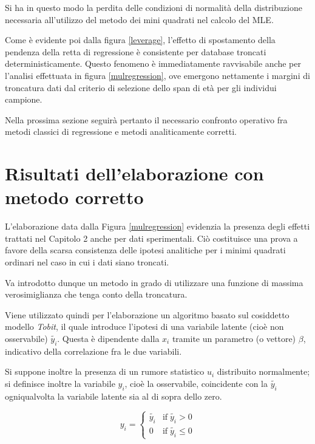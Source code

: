 \documentclass[12pt,openright,twoside,a4paper]{book}
\begin{document}
Si ha in questo modo la perdita delle condizioni di normalità della distribuzione necessaria all'utilizzo del metodo dei mini quadrati nel calcolo del MLE.

Come è evidente poi dalla figura \ref{leverage}, l'effetto di spostamento della pendenza della retta di regressione è consistente per database troncati deterministicamente.
Questo fenomeno è immediatamente ravvisabile anche per l'analisi effettuata in figura \ref{mulregression}, ove emergono nettamente i margini di troncatura dati dal criterio di selezione dello span di età per gli individui campione.

Nella prossima sezione seguirà pertanto il necessario confronto operativo fra metodi classici di regressione e metodi analiticamente corretti.

\section{Risultati dell'elaborazione con metodo corretto}

L'elaborazione data dalla Figura \ref{mulregression} evidenzia la presenza degli effetti trattati nel Capitolo 2 anche per dati sperimentali.
Ciò costituisce una prova a favore della scarsa consistenza delle ipotesi analitiche per i minimi quadrati ordinari nel caso in cui i dati siano troncati.

Va introdotto dunque un metodo in grado di utilizzare una funzione di massima verosimiglianza che tenga conto della troncatura.

Viene utilizzato quindi per l'elaborazione un algoritmo basato sul cosiddetto modello \textit{Tobit}, il quale introduce l'ipotesi di una variabile latente (cioè non osservabile) $\tilde{y_i}$.
Questa è dipendente dalla $x_i$ tramite un parametro (o vettore) $\beta$, indicativo della correlazione fra le due variabili.

Si suppone inoltre la presenza di un rumore statistico $u_i$ distribuito normalmente; si definisce inoltre la variabile $y_i$, cioè la osservabile, coincidente con la $\tilde{y_i}$ ogniqualvolta la variabile latente sia al di sopra dello zero.

\begin{equation}
y_i = \begin{cases} 
    \tilde{y_i} & \textrm{if} \; \tilde{y_i} >0 \\ 
    0     & \textrm{if} \; \tilde{y_i} \leq 0
\end{cases}
\end{equation}
\end{document}
